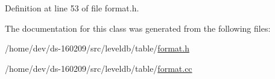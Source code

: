 Definition at line 53 of file format.\+h.



The documentation for this class was generated from the following files\+:\begin{DoxyCompactItemize}
\item 
/home/dev/ds-\/160209/src/leveldb/table/\hyperlink{format_8h}{format.\+h}\item 
/home/dev/ds-\/160209/src/leveldb/table/\hyperlink{format_8cc}{format.\+cc}\end{DoxyCompactItemize}
